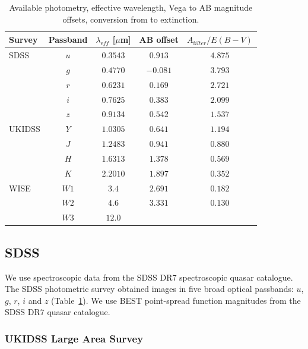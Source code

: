 \begin{table}
  \footnotesize
  \centering
  \begin{tabular}{lcccc}
    \hline 
    Survey & Passband & $\lambda_{\mathrm eff}$ [$\mu$m] & AB offset & $A_{\mathrm filter}/E(B-V)$ \\
    \hline 
    SDSS & $u$ & $0.3543$ & $ 0.913$ & $4.875$ \\
         & $g$ & $0.4770$ & $-0.081$ & $3.793$ \\
         & $r$ & $0.6231$ & $ 0.169$ & $2.721$ \\
         & $i$ & $0.7625$ & $ 0.383$ & $2.099$ \\
         & $z$ & $0.9134$ & $ 0.542$ & $1.537$ \\
    UKIDSS & $Y$ & $1.0305$ &  $0.641$ & $1.194$ \\
           & $J$ & $1.2483$ &  $0.941$ & $0.880$ \\
           & $H$ & $1.6313$ &  $1.378$ & $0.569$ \\
           & $K$ & $2.2010$ &  $1.897$ & $0.352$ \\
    WISE & $W1$ & $3.4$ & $2.691$ & $0.182$\\
         & $W2$ & $4.6$ & $3.331$ & $0.130$\\
         & $W3$ & $12.0$ & & \\           
    \hline
  \end{tabular}
  \caption[{Available photometry, effective wavelength, Vega to AB magnitude offsets, conversion from \ebv to extinction.}]{Available photometry, effective wavelength, Vega to AB magnitude offsets, conversion from \ebv to extinction. }
  \label{tab:photometry}
\end{table}

\subsection{SDSS}

We use spectroscopic data from the SDSS DR$7$ spectroscopic quasar catalogue.
The SDSS photometric survey obtained images in five broad optical passbands: $u$, $g$, $r$, $i$ and $z$ (Table~\ref{tab:photometry}).  
We use BEST point-spread function magnitudes from the SDSS DR$7$ quasar catalogue.

\subsubsection{UKIDSS Large Area Survey}


